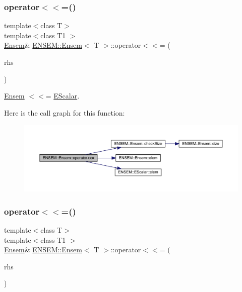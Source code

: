 \subsubsection{\texorpdfstring{operator$<$$<$=()}{operator<<=()}\hspace{0.1cm}{\footnotesize\ttfamily [1/2]}}
{\footnotesize\ttfamily template$<$class T$>$ \\
template$<$class T1 $>$ \\
\mbox{\hyperlink{classENSEM_1_1Ensem}{Ensem}}\& \mbox{\hyperlink{classENSEM_1_1Ensem}{E\+N\+S\+E\+M\+::\+Ensem}}$<$ T $>$\+::operator$<$$<$= (\begin{DoxyParamCaption}\item[{const \mbox{\hyperlink{classENSEM_1_1EScalar}{E\+Scalar}}$<$ T1 $>$ \&}]{rhs }\end{DoxyParamCaption})\hspace{0.3cm}{\ttfamily [inline]}}



\mbox{\hyperlink{classENSEM_1_1Ensem}{Ensem}} $<$$<$= \mbox{\hyperlink{classENSEM_1_1EScalar}{E\+Scalar}}. 

Here is the call graph for this function\+:
\nopagebreak
\begin{figure}[H]
\begin{center}
\leavevmode
\includegraphics[width=350pt]{d7/d3e/classENSEM_1_1Ensem_a9aecabccdc31d9b43db877a82879f702_cgraph}
\end{center}
\end{figure}
\mbox{\label{classENSEM_1_1Ensem_a9aecabccdc31d9b43db877a82879f702}} 
\subsubsection{\texorpdfstring{operator$<$$<$=()}{operator<<=()}\hspace{0.1cm}{\footnotesize\ttfamily [2/2]}}
{\footnotesize\ttfamily template$<$class T$>$ \\
template$<$class T1 $>$ \\
\mbox{\hyperlink{classENSEM_1_1Ensem}{Ensem}}\& \mbox{\hyperlink{classENSEM_1_1Ensem}{E\+N\+S\+E\+M\+::\+Ensem}}$<$ T $>$\+::operator$<$$<$= (\begin{DoxyParamCaption}\item[{const \mbox{\hyperlink{classENSEM_1_1EScalar}{E\+Scalar}}$<$ T1 $>$ \&}]{rhs }\end{DoxyParamCaption})\hspace{0.3cm}{\ttfamily [inline]}}



